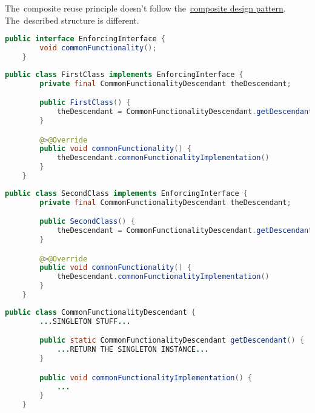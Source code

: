 \warning The~composite reuse principle doesn't follow the~\hyperref[compositedp]{composite design pattern}.
The~described structure is different.
\newpage

\enlargethispage{20mm}
\thispagestyle{empty}
\begin{lstlisting}[language=Java, title={Common functionality enforcing interface}]
    public interface EnforcingInterface {
        void commonFunctionality();
    }
\end{lstlisting}
\begin{lstlisting}[language=Java, title={First class to~contain common functionality}]
    public class FirstClass implements EnforcingInterface {
        private final CommonFunctionalityDescendant theDescendant;

        public FirstClass() {
            theDescendant = CommonFunctionalityDescendant.getDescendant();
        }

        @>@Override
        public void commonFunctionality() {
            theDescendant.commonFunctionalityImplementation()
        }
    }
\end{lstlisting}
\begin{lstlisting}[language=Java, title={Second class to~contain common functionality}]
    public class SecondClass implements EnforcingInterface {
        private final CommonFunctionalityDescendant theDescendant;

        public SecondClass() {
            theDescendant = CommonFunctionalityDescendant.getDescendant();
        }

        @>@Override
        public void commonFunctionality() {
            theDescendant.commonFunctionalityImplementation()
        }
    }
\end{lstlisting}
\begin{lstlisting}[language=Java, title={\hyperref[singletondp]{Singleton} descendant containing the~common functionality implementation}]
    public class CommonFunctionalityDescendant {
        ...SINGLETON STUFF...

        public static CommonFunctionalityDescendant getDescendant() {
            ...RETURN THE SINGLETON INSTANCE...
        }

        public void commonFunctionalityImplementation() {
            ...
        }
    }
\end{lstlisting}
